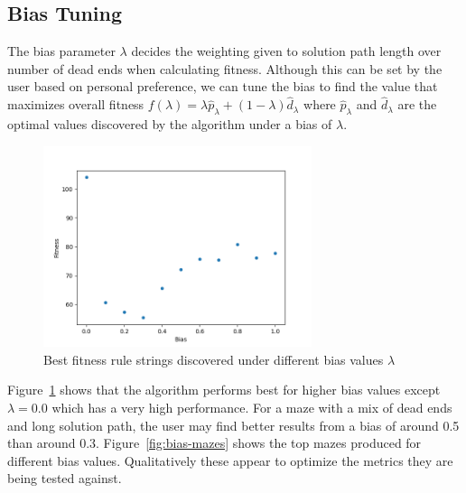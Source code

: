 \subsection{Bias Tuning}
The bias parameter $\lambda$ decides the weighting given to solution path length over number of dead ends when calculating fitness. Although this can be set by the user based on personal preference, we can tune the bias to find the value that maximizes overall fitness  $f(\lambda) = \lambda \hat{p}_\lambda + (1-\lambda)\hat{d}_\lambda$ where $ \hat{p}_\lambda$ and $\hat{d}_\lambda$ are the optimal values discovered by the algorithm under a bias of $\lambda$.\\ 
\begin{figure}[!h]
\centering
\includegraphics[width=0.7\textwidth]{images/bias-tuning.png}
\caption{Best fitness rule strings discovered under different bias values $\lambda$}
\label{fig:bias-tuning}
\end{figure}
Figure~\ref{fig:bias-tuning} shows that the algorithm performs best for higher bias values except $\lambda=0.0$ which has a very high performance. For a maze with a mix of dead ends and long solution path, the user may find better results from a bias of around 0.5 than around 0.3. Figure~\ref{fig:bias-mazes} shows the top mazes produced for different bias values. Qualitatively these appear to optimize the metrics they are being tested against.\\
